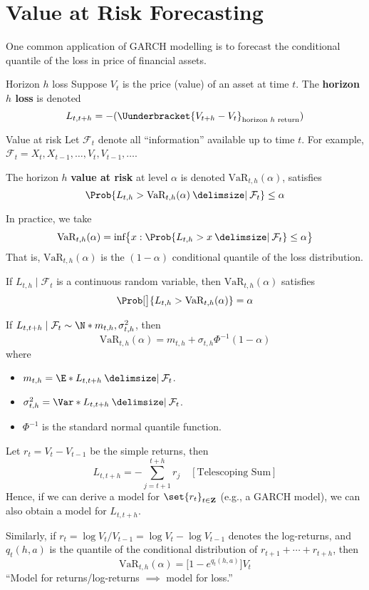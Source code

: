\section{Value at Risk Forecasting}
One common application of GARCH modelling is to forecast the conditional quantile
of the loss in price of financial assets.
\begin{Definition}{Horizon $ h $ loss}{}
    Suppose $ V_t $ is the price (value) of an asset at time $ t $.
    The \textbf{horizon $h$ loss} is denoted
    \[ L_{t,t+h}=-(\Uunderbracket{V_{t+h}-V_t}_{\text{horizon $ h $ return}}) \]
\end{Definition}
\begin{Definition}{Value at risk}{}
    Let $ \mathcal{F}_t $ denote all ``information'' available up to time $ t $.
    For example, $ \mathcal{F}_t=X_t,X_{t-1},\ldots,V_t,V_{t-1},\ldots $.

    The horizon $ h $ \textbf{value at risk} at level $ \alpha $
    is denoted $ \text{VaR}_{t,h}(\alpha) $, satisfies
    \[ \Prob{L_{t,h}>\text{VaR}_{t,h}(\alpha)\given \mathcal{F}_t}\le \alpha \]
\end{Definition}
In practice, we take
\[ \text{VaR}_{t,h}(\alpha)=\text{inf}\bigl\{x: \Prob{L_{t,h}>x\given\mathcal{F}_t}\le \alpha\bigr\} \]
That is, $ \text{VaR}_{t,h}(\alpha) $ is the $ (1-\alpha) $ conditional quantile
of the loss distribution.
\begin{Remark}{}{}
    If $ L_{t,h}\mid \mathcal{F}_t $ is a continuous random variable, then
    $ \text{VaR}_{t,h}(\alpha) $ satisfies
    \[ \Prob[\big]{L_{t,h}>\text{VaR}_{t,h}(\alpha)}=\alpha \]
\end{Remark}
\begin{Example}{}{}
    If $ L_{t,t+h}\mid\mathcal{F}_t \sim \N*{m_{t,h},\sigma^2_{t,h}} $, then
    \[ \text{VaR}_{t,h}(\alpha)=m_{t,h}+\sigma_{t,h}\Phi^{-1}(1-\alpha) \]
    where
    \begin{itemize}
        \item $ m_{t,h}=\E*{L_{t,t+h}\given \mathcal{F}_t} $.
        \item $ \sigma^2_{t,h}=\Var*{L_{t,t+h}\given \mathcal{F}_t} $.
        \item $ \Phi^{-1} $ is the standard normal quantile function.
    \end{itemize}
\end{Example}
\begin{Remark}{}{}
    Let $ r_t =V_t-V_{t-1} $ be the simple returns, then
    \[ L_{t,t+h}=-\sum_{j=t+1}^{t+h}r_j\quad[\text{Telescoping Sum}]  \]
    Hence, if we can derive a model for $ \set{r_t}_{t\in\mathbf{Z}} $
    (e.g., a GARCH model), we can also obtain a model for $ L_{t,t+h} $.

    \vspace{1mm}

    Similarly, if $ r_t=\log{V_t/V_{t-1}}=\log{V_t}-\log{V_{t-1}} $
    denotes the log-returns, and $ q_t(h,a) $ is the quantile
    of the conditional distribution of $ r_{t+1}+\cdots+r_{t+h} $,
    then
    \[ \text{VaR}_{t,h}(\alpha)=\bigl[1-e^{q_t(h,a)}\bigr]V_t \]
    ``Model for returns/log-returns $ \implies  $ model for loss.''
\end{Remark}
